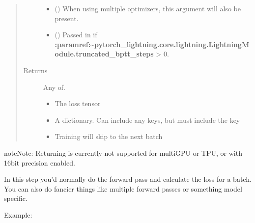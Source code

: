 \documentclass[letterpaper,10pt,english]{sphinxmanual}
\begin{document}
\begin{fulllineitems}
\begin{fulllineitems}
\begin{quote}
\begin{description}
\begin{itemize}
\item {} 
\sphinxAtStartPar
{} () \textendash{} When using multiple optimizers, this argument will also be present.

\item {} 
\sphinxAtStartPar
{} () \textendash{} Passed in if
{\color{red}\bfseries{}:paramref:\textasciigrave{}\textasciitilde{}pytorch\_lightning.core.lightning.LightningModule.truncated\_bptt\_steps\textasciigrave{}} \textgreater{} 0.

\end{itemize}

\item[{Returns}] \leavevmode
\sphinxAtStartPar

\sphinxAtStartPar
Any of.
\begin{itemize}
\item {} 
\sphinxAtStartPar
{} \sphinxhyphen{} The loss tensor

\item {} 
\sphinxAtStartPar
{} \sphinxhyphen{} A dictionary. Can include any keys, but must include the key 

\item {} 
\sphinxAtStartPar
{} \sphinxhyphen{} Training will skip to the next batch

\end{itemize}


\end{description}\end{quote}

\begin{sphinxadmonition}{note}{Note:}
\sphinxAtStartPar
Returning  is currently not supported for multi\sphinxhyphen{}GPU or TPU, or with 16\sphinxhyphen{}bit precision enabled.
\end{sphinxadmonition}

\sphinxAtStartPar
In this step you’d normally do the forward pass and calculate the loss for a batch.
You can also do fancier things like multiple forward passes or something model specific.

\sphinxAtStartPar
Example:


\end{fulllineitems}
\end{fulllineitems}
\end{document}
